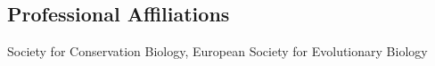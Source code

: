 \documentclass[letterpaper]{article}
\def\footerlink{http://bradduthie.github.io/DuthieCV.pdf}
\renewenvironment{itemize}{
  \begin{list}{}{
    \setlength{\leftmargin}{1.5em}
  }
}{
  \end{list}
}
\begin{document}
\begin{small}
\section*{Professional Affiliations}
\begin{itemize}
\item Society for Conservation Biology, European Society for Evolutionary Biology
\end{itemize}

\end{small}

\bigskip

\end{document}
